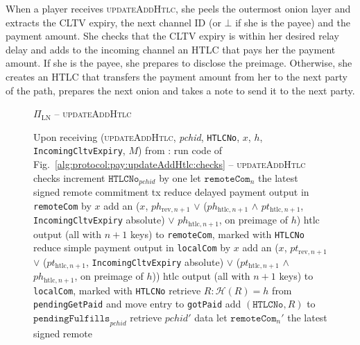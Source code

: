   When a player receives \textsc{updateAddHtlc}, she peels the outermost onion
  layer and extracts the CLTV expiry, the next channel ID (or $\bot$ if she is
  the payee) and the payment amount. She checks that the CLTV expiry is within
  her desired relay delay and adds to the incoming channel an HTLC that pays her
  the payment amount. If she is the payee, she prepares to disclose the
  preimage. Otherwise, she creates an HTLC that transfers the payment amount
  from her to the next party of the path, prepares the next onion and takes a
  note to send it to the next party.

  \begin{figure}[H]
    \begin{protocolbox}{$\Pi_{\mathrm{LN}}$ -- \textsc{updateAddHtlc}}
      \begin{algorithmic}[1]
        \State Upon receiving (\textsc{updateAddHtlc}, \textit{pchid},
        \texttt{HTLCNo}, $x$, $h$, \texttt{IncomingCltvExpiry}, $M$) from \bob:
        \Indent
          \State run code of Fig.~\ref{alg:protocol:pay:updateAddHtlc:checks} --
          \textsc{updateAddHtlc} checks
          \State increment $\mathtt{HTLCNo}_{\mathit{pchid}}$ by one
          \State let $\mathtt{remoteCom}_n$ the latest signed remote commitment
          tx
          \State reduce delayed payment output in \texttt{remoteCom} by $x$
          \State add an ($x$, $ph_{\mathrm{rev}, n+1}$ $\vee$
          ($ph_{\mathrm{htlc}, n+1}$ $\wedge$ $pt_{\mathrm{htlc}, n+1}$,
          \texttt{IncomingCltvExpiry} absolute) $\vee$ $ph_{\mathrm{htlc},
          n+1}$, on preimage of $h$) htlc output (all with $n+1$ keys) to
          \texttt{remoteCom}, marked with \texttt{HTLCNo}
          \State reduce simple payment output in \texttt{localCom} by $x$
          \State add an ($x$, $pt_{\mathrm{rev}, n+1}$ $\vee$
          ($pt_{\mathrm{htlc}, n+1}$, \texttt{IncomingCltvExpiry} absolute)
          $\vee$ ($pt_{\mathrm{htlc}, n+1}$ $\wedge$ $ph_{\mathrm{htlc}, n+1}$,
          on preimage of $h$)) htlc output (all with $n+1$ keys) to
          \texttt{localCom}, marked with \texttt{HTLCNo}
            \State retrieve $R : \mathcal{H}\left(R\right) = h$ from
            \texttt{pendingGetPaid} and move entry to \texttt{gotPaid}
            \State add $\left(\mathtt{HTLCNo}, R\right)$ to
            $\mathtt{pendingFulfills}_{\mathit{pchid}}$
           
            \State retrieve $\mathit{pchid}'$ data
            \State let $\mathtt{remoteCom}_n'$ the latest signed remote

\end{algorithmic}
\end{protocolbox}
\end{figure}
